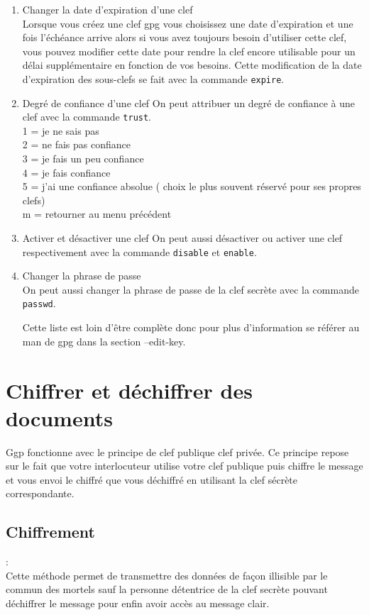 \begin{enumerate}
\item Changer la date d'expiration d'une clef\\
Lorsque vous créez une clef gpg vous choisissez une date d'expiration et une fois l'échéance arrive alors si vous avez toujours besoin 
d'utiliser cette clef, vous pouvez modifier cette date pour rendre la clef encore utilisable pour un délai supplémentaire
en fonction de vos besoins. Cette modification de la date d'expiration des sous-clefs se fait avec la commande  \texttt{expire}.

\item Degré de confiance d'une clef 
On peut attribuer un degré de confiance à une clef avec la commande \texttt{trust}.\\
  1 = je ne sais pas\\
  2 = ne fais pas confiance\\
  3 = je fais un peu confiance\\
  4 = je fais confiance\\
  5 = j'ai une confiance absolue ( choix le plus souvent réservé pour ses propres clefs)\\
  m = retourner au menu précédent\\
  

\item Activer et désactiver une clef
On peut aussi désactiver ou activer une clef respectivement avec la commande \texttt{disable} et \texttt{enable}.

\item Changer la phrase de passe\\
On peut aussi changer la phrase de passe de la clef secrète avec la commande \texttt{passwd}.


Cette liste est loin d'être complète donc pour plus d'information se référer au man de gpg dans la section --edit-key.\\
\end{enumerate}
\section{Chiffrer et déchiffrer des documents}
  
Ggp fonctionne avec le principe de clef publique clef privée. Ce principe repose sur le fait que votre interlocuteur
utilise votre clef publique puis chiffre le message et vous envoi le chiffré que vous déchiffré en utilisant 
la clef sécrète correspondante.


\subsection {Chiffrement}:\\
Cette méthode permet de transmettre des données de façon illisible par le commun des mortels sauf la personne détentrice de la clef 
secrète pouvant déchiffrer le message pour enfin avoir accès au message clair.\\

